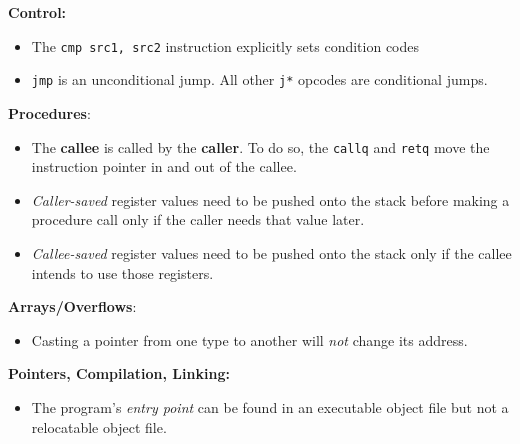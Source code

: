 \documentclass[titlepage, 12pt, leqno]{article}
\begin{document}
\setlength{\parskip}{0.5\baselineskip}
\setlength{\parindent}{15pt}
\setlength{\belowdisplayskip}{0pt}
\setlength{\abovedisplayskip}{0pt}
\setlength{\belowdisplayshortskip}{0pt}
\setlength{\abovedisplayshortskip}{0pt}



\begin{multicols*}{2}

\textbf{Control:}
\begin{itemize}
    \item The \texttt{cmp src1, src2} instruction explicitly sets condition 
        codes
    \item \texttt{jmp} is an unconditional jump. All other \texttt{j*} opcodes
        are conditional jumps.
\end{itemize}

\textbf{Procedures}:
\begin{itemize}
    \item The \textbf{callee} is called by the \textbf{caller}. To do so, the
        \texttt{callq} and \texttt{retq} move the instruction pointer in and out 
        of the callee.
    \item \textit{Caller-saved} register values need to be pushed onto the stack
        before making a procedure call only if the caller needs that value later.
    \item \textit{Callee-saved} register values need to be pushed onto the stack
        only if the callee intends to use those registers.
\end{itemize}

\textbf{Arrays/Overflows}:
\begin{itemize}
    \item Casting a pointer from one type to another will \textit{not} change its
        address.
\end{itemize}

\textbf{Pointers, Compilation, Linking:}
\begin{itemize}
    \item The program's \textit{entry point} can be found in an executable object
        file but not a relocatable object file.
\end{itemize}


\end{multicols*}
\end{document}
